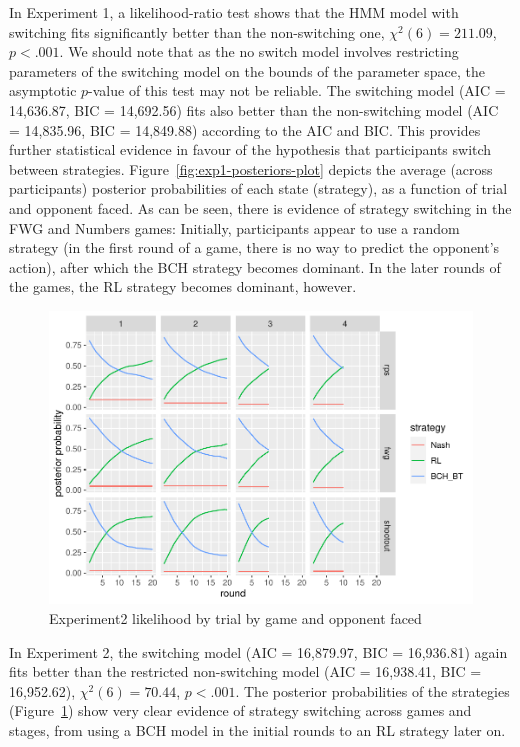 \documentclass[english,man,floatsintext]{apa6}
\begin{document}
In Experiment 1, a likelihood-ratio test shows that the HMM model with switching fits significantly better than the non-switching one, \(\chi^2(6) = 211.09\), \(p < .001\). We should note that as the no switch model involves restricting parameters of the switching model on the bounds of the parameter space, the asymptotic \(p\)-value of this test may not be reliable. The switching model (AIC = 14,636.87, BIC = 14,692.56) fits also better than the non-switching model (AIC = 14,835.96, BIC = 14,849.88) according to the AIC and BIC. This provides further statistical evidence in favour of the hypothesis that participants switch between strategies. Figure~\ref{fig:exp1-posteriors-plot} depicts the average (across participants) posterior probabilities of each state (strategy), as a function of trial and opponent faced. As can be seen, there is evidence of strategy switching in the FWG and Numbers games: Initially, participants appear to use a random strategy (in the first round of a game, there is no way to predict the opponent's action), after which the BCH strategy becomes dominant. In the later rounds of the games, the RL strategy becomes dominant, however.

\begin{figure}

{\centering \includegraphics{paper_draft_2021_files/figure-latex/exp2-posteriors-plot-1} 

}

\caption{Experiment2 likelihood by trial by game and opponent faced}\label{fig:exp2-posteriors-plot}
\end{figure}

In Experiment 2, the switching model (AIC = 16,879.97, BIC = 16,936.81) again fits better than the restricted non-switching model (AIC = 16,938.41, BIC = 16,952.62), \(\chi^2(6) = 70.44\), \(p < .001\). The posterior probabilities of the strategies (Figure~\ref{fig:exp2-posteriors-plot}) show very clear evidence of strategy switching across games and stages, from using a BCH model in the initial rounds to an RL strategy later on.
\end{document}
